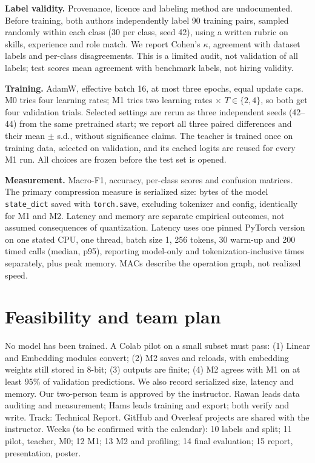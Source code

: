 \documentclass[11pt]{article}
\begin{document}
\textbf{Label validity.} Provenance, licence and labeling method are undocumented. Before training, both authors independently label 90 training pairs, sampled randomly within each class (30 per class, seed 42), using a written rubric on skills, experience and role match. We report Cohen's $\kappa$, agreement with dataset labels and per-class disagreements. This is a limited audit, not validation of all labels; test scores mean agreement with benchmark labels, not hiring validity.

\textbf{Training.} AdamW, effective batch 16, at most three epochs, equal update caps. M0 tries four learning rates; M1 tries two learning rates $\times$ $T\in\{2,4\}$, so both get four validation trials. Selected settings are rerun as three independent seeds (42--44) from the same pretrained start; we report all three paired differences and their mean $\pm$ s.d., without significance claims. The teacher is trained once on training data, selected on validation, and its cached logits are reused for every M1 run. All choices are frozen before the test set is opened.

\textbf{Measurement.} Macro-F1, accuracy, per-class scores and confusion matrices. The primary compression measure is serialized size: bytes of the model \texttt{state\_dict} saved with \texttt{torch.save}, excluding tokenizer and config, identically for M1 and M2. Latency and memory are separate empirical outcomes, not assumed consequences of quantization. Latency uses one pinned PyTorch version on one stated CPU, one thread, batch size 1, 256 tokens, 30 warm-up and 200 timed calls (median, p95), reporting model-only and tokenization-inclusive times separately, plus peak memory. MACs describe the operation graph, not realized speed.

\section{Feasibility and team plan}
No model has been trained. A Colab pilot on a small subset must pass: (1) Linear and Embedding modules convert; (2) M2 saves and reloads, with embedding weights still stored in 8-bit; (3) outputs are finite; (4) M2 agrees with M1 on at least 95\% of validation predictions. We also record serialized size, latency and memory. Our two-person team is approved by the instructor. Rawan leads data auditing and measurement; Hams leads training and export; both verify and write. Track: Technical Report. GitHub and Overleaf projects are shared with the instructor. Weeks (to be confirmed with the calendar): 10 labels and split; 11 pilot, teacher, M0; 12 M1; 13 M2 and profiling; 14 final evaluation; 15 report, presentation, poster.
\end{document}
